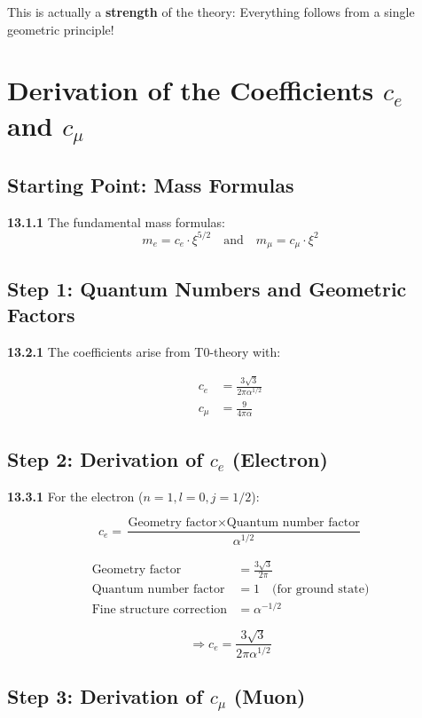 \documentclass[12pt,a4paper]{article}
\begin{document}
This is actually a \textbf{strength} of the theory: Everything follows from a single geometric principle!


\section{Derivation of the Coefficients $c_e$ and $c_\mu$}

\subsection{Starting Point: Mass Formulas}

\noindent \textbf{13.1.1} The fundamental mass formulas:
\[
m_e = c_e \cdot \xi^{5/2} \quad \text{and} \quad m_\mu = c_\mu \cdot \xi^2
\]

\subsection{Step 1: Quantum Numbers and Geometric Factors}

\noindent \textbf{13.2.1} The coefficients arise from T0-theory with:

\begin{align*}
	c_e &= \frac{3\sqrt{3}}{2\pi\alpha^{1/2}} \\
	c_\mu &= \frac{9}{4\pi\alpha}
\end{align*}

\subsection{Step 2: Derivation of $c_e$ (Electron)}

\noindent \textbf{13.3.1} For the electron ($n=1, l=0, j=1/2$):

\[
c_e = \frac{\text{Geometry factor} \times \text{Quantum number factor}}{\alpha^{1/2}}
\]

\begin{align*}
	\text{Geometry factor} &= \frac{3\sqrt{3}}{2\pi} \\
	\text{Quantum number factor} &= 1 \quad \text{(for ground state)} \\
	\text{Fine structure correction} &= \alpha^{-1/2}
\end{align*}

\[
\Rightarrow c_e = \frac{3\sqrt{3}}{2\pi\alpha^{1/2}}
\]

\subsection{Step 3: Derivation of $c_\mu$ (Muon)}
\end{document}
